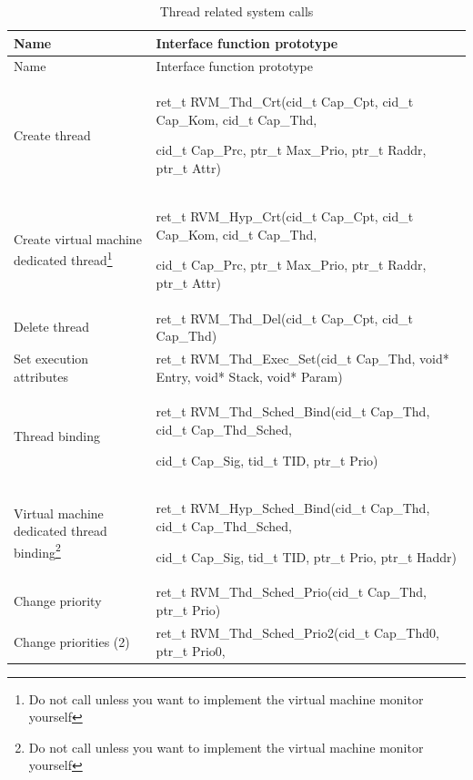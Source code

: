 \begin{xltabular}{\textwidth}{@{}>{\hsize\raggedright\arraybackslash}X>{\hsize\raggedright\arraybackslash}X@{}}
\caption{Thread related system calls}\label{tab:3-9}\\
\toprule
Name & Interface function prototype\tabularnewline
\endfirsthead
\toprule
Name & Interface function prototype\tabularnewline
\midrule
\endhead
\bottomrule
\endlastfoot
Create thread\strut
 & ret\_\allowbreak{}t RVM\_\allowbreak{}Thd\_\allowbreak{}Crt(cid\_\allowbreak{}t Cap\_\allowbreak{}Cpt, cid\_\allowbreak{}t Cap\_\allowbreak{}Kom, cid\_\allowbreak{}t Cap\_\allowbreak{}Thd,

cid\_\allowbreak{}t Cap\_\allowbreak{}Prc, ptr\_\allowbreak{}t Max\_\allowbreak{}Prio, ptr\_\allowbreak{}t Raddr, ptr\_\allowbreak{}t Attr)\strut
\tabularnewline
Create virtual machine dedicated thread\footnote{Do not call unless you want to implement the virtual machine monitor yourself}\strut
 & ret\_\allowbreak{}t RVM\_\allowbreak{}Hyp\_\allowbreak{}Crt(cid\_\allowbreak{}t Cap\_\allowbreak{}Cpt, cid\_\allowbreak{}t Cap\_\allowbreak{}Kom, cid\_\allowbreak{}t Cap\_\allowbreak{}Thd,

cid\_\allowbreak{}t Cap\_\allowbreak{}Prc, ptr\_\allowbreak{}t Max\_\allowbreak{}Prio, ptr\_\allowbreak{}t Raddr, ptr\_\allowbreak{}t Attr)\strut
\tabularnewline
Delete thread & ret\_\allowbreak{}t RVM\_\allowbreak{}Thd\_\allowbreak{}Del(cid\_\allowbreak{}t Cap\_\allowbreak{}Cpt, cid\_\allowbreak{}t
Cap\_\allowbreak{}Thd)\tabularnewline
Set execution attributes & ret\_\allowbreak{}t RVM\_\allowbreak{}Thd\_\allowbreak{}Exec\_\allowbreak{}Set(cid\_\allowbreak{}t Cap\_\allowbreak{}Thd, void* Entry,
void* Stack, void* Param)\tabularnewline
Thread binding\strut
 & ret\_\allowbreak{}t RVM\_\allowbreak{}Thd\_\allowbreak{}Sched\_\allowbreak{}Bind(cid\_\allowbreak{}t Cap\_\allowbreak{}Thd, cid\_\allowbreak{}t Cap\_\allowbreak{}Thd\_\allowbreak{}Sched,

cid\_\allowbreak{}t Cap\_\allowbreak{}Sig, tid\_\allowbreak{}t TID, ptr\_\allowbreak{}t Prio)\strut
\tabularnewline
Virtual machine dedicated thread binding\footnote{Do not call unless you want to implement the virtual machine monitor yourself}\strut
 & ret\_\allowbreak{}t RVM\_\allowbreak{}Hyp\_\allowbreak{}Sched\_\allowbreak{}Bind(cid\_\allowbreak{}t Cap\_\allowbreak{}Thd, cid\_\allowbreak{}t Cap\_\allowbreak{}Thd\_\allowbreak{}Sched,

cid\_\allowbreak{}t Cap\_\allowbreak{}Sig, tid\_\allowbreak{}t TID, ptr\_\allowbreak{}t Prio, ptr\_\allowbreak{}t Haddr)\strut
\tabularnewline
Change priority & ret\_\allowbreak{}t RVM\_\allowbreak{}Thd\_\allowbreak{}Sched\_\allowbreak{}Prio(cid\_\allowbreak{}t Cap\_\allowbreak{}Thd, ptr\_\allowbreak{}t
Prio)\tabularnewline
Change priorities (2)\strut
 & ret\_\allowbreak{}t RVM\_\allowbreak{}Thd\_\allowbreak{}Sched\_\allowbreak{}Prio2(cid\_\allowbreak{}t Cap\_\allowbreak{}Thd0, ptr\_\allowbreak{}t Prio0,


\end{xltabular}
